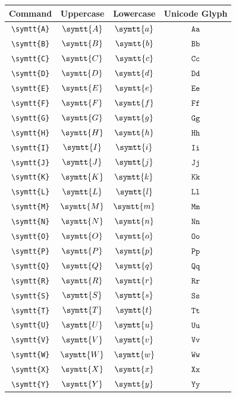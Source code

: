 \documentclass[12pt,a4paper]{article}
\begin{document}
\begin{longtable}{|c|c|c|c|}
\hline
\textbf{Command} & \textbf{Uppercase} & \textbf{Lowercase} & \textbf{Unicode Glyph} \\
\hline
\verb|\symtt{A}| & $\symtt{A}$ & $\symtt{a}$ & $ 𝙰 𝚊 $ \\
\verb|\symtt{B}| & $\symtt{B}$ & $\symtt{b}$ & $ 𝙱 𝚋 $ \\
\verb|\symtt{C}| & $\symtt{C}$ & $\symtt{c}$ & $ 𝙲 𝚌 $ \\
\verb|\symtt{D}| & $\symtt{D}$ & $\symtt{d}$ & $ 𝙳 𝚍 $ \\
\verb|\symtt{E}| & $\symtt{E}$ & $\symtt{e}$ & $ 𝙴 𝚎 $ \\
\verb|\symtt{F}| & $\symtt{F}$ & $\symtt{f}$ & $ 𝙵 𝚏 $ \\
\verb|\symtt{G}| & $\symtt{G}$ & $\symtt{g}$ & $ 𝙶 𝚐 $ \\
\verb|\symtt{H}| & $\symtt{H}$ & $\symtt{h}$ & $ 𝙷 𝚑 $ \\
\verb|\symtt{I}| & $\symtt{I}$ & $\symtt{i}$ & $ 𝙸 𝚒 $ \\
\verb|\symtt{J}| & $\symtt{J}$ & $\symtt{j}$ & $ 𝙹 𝚓 $ \\
\verb|\symtt{K}| & $\symtt{K}$ & $\symtt{k}$ & $ 𝙺 𝚔 $ \\
\verb|\symtt{L}| & $\symtt{L}$ & $\symtt{l}$ & $ 𝙻 𝚕 $ \\
\verb|\symtt{M}| & $\symtt{M}$ & $\symtt{m}$ & $ 𝙼 𝚖 $ \\
\verb|\symtt{N}| & $\symtt{N}$ & $\symtt{n}$ & $ 𝙽 𝚗 $ \\
\verb|\symtt{O}| & $\symtt{O}$ & $\symtt{o}$ & $ 𝙾 𝚘 $ \\
\verb|\symtt{P}| & $\symtt{P}$ & $\symtt{p}$ & $ 𝙿 𝚙 $ \\
\verb|\symtt{Q}| & $\symtt{Q}$ & $\symtt{q}$ & $ 𝚀 𝚚 $ \\
\verb|\symtt{R}| & $\symtt{R}$ & $\symtt{r}$ & $ 𝚁 𝚛 $ \\
\verb|\symtt{S}| & $\symtt{S}$ & $\symtt{s}$ & $ 𝚂 𝚜 $ \\
\verb|\symtt{T}| & $\symtt{T}$ & $\symtt{t}$ & $ 𝚃 𝚝 $ \\
\verb|\symtt{U}| & $\symtt{U}$ & $\symtt{u}$ & $ 𝚄 𝚞 $ \\
\verb|\symtt{V}| & $\symtt{V}$ & $\symtt{v}$ & $ 𝚅 𝚟 $ \\
\verb|\symtt{W}| & $\symtt{W}$ & $\symtt{w}$ & $ 𝚆 𝚠 $ \\
\verb|\symtt{X}| & $\symtt{X}$ & $\symtt{x}$ & $ 𝚇 𝚡 $ \\
\verb|\symtt{Y}| & $\symtt{Y}$ & $\symtt{y}$ & $ 𝚈 𝚢 $ \\

\end{longtable}
\end{document}
